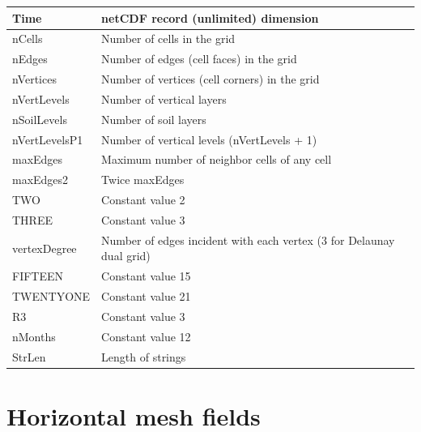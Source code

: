 \documentclass[11pt]{report}
\begin{document}
{\small
\begin{longtable}{|p{1.75in} |p{4.5in}|}
 \hline
        Time     &   netCDF record (unlimited) dimension \\ \hline
        nCells       &   Number of cells in the grid \\ \hline
        nEdges      &   Number of edges (cell faces) in the grid \\ \hline
        nVertices    &   Number of vertices (cell corners) in the grid \\ \hline
        nVertLevels     &   Number of vertical layers \\ \hline
        nSoilLevels      &   Number of soil layers \\ \hline
        nVertLevelsP1   &   Number of vertical levels (nVertLevels + 1) \\ \hline
        maxEdges        &   Maximum number of neighbor cells of any cell \\ \hline
        maxEdges2       &   Twice maxEdges \\ \hline
        TWO              &   Constant value 2 \\ \hline
        THREE            &   Constant value 3 \\ \hline
        vertexDegree     &   Number of edges incident with each vertex (3 for Delaunay dual grid) \\ \hline
        FIFTEEN         &   Constant value 15 \\ \hline
        TWENTYONE       &   Constant value 21 \\ \hline
        R3               &   Constant value 3 \\ \hline
        nMonths         &   Constant value 12 \\ \hline
        StrLen          &   Length of strings \\ \hline
\end{longtable}
}

\section{Horizontal mesh fields}
\label{sec:mesh_fields}
\end{document}
